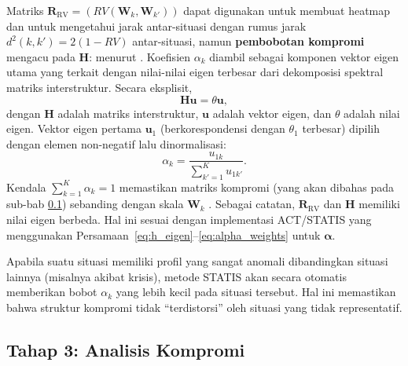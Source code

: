 Matriks $\mathbf{R}_{\mathrm{RV}}=(RV(\mathbf{W}_k,\mathbf{W}_{k'}))$ dapat digunakan untuk membuat heatmap dan untuk mengetahui jarak antar-situasi dengan rumus jarak $d^2(k,k')=2(1-RV)$ antar-situasi, namun \textbf{pembobotan kompromi} mengacu pada $\mathbf{H}$: menurut \citet{lavit94}. Koefisien $\alpha_k$ diambil sebagai komponen vektor eigen utama yang terkait dengan nilai-nilai eigen terbesar dari dekomposisi spektral matriks interstruktur. Secara eksplisit,
\begin{equation}\label{eq:h_eigen}
  \mathbf{H} \mathbf{u} = \theta \mathbf{u},
\end{equation}
dengan $\mathbf{H}$ adalah matriks interstruktur, $\mathbf{u}$ adalah vektor eigen, dan $\theta$ adalah nilai eigen. Vektor eigen pertama $\mathbf{u}_1$ (berkorespondensi dengan $\theta_1$ terbesar) dipilih dengan elemen non-negatif lalu dinormalisasi:
\begin{equation}\label{eq:alpha_weights}
  \alpha_k = \frac{u_{1k}}{\displaystyle\sum_{k'=1}^{K} u_{1k'}}.
\end{equation}
Kendala $\sum_{k=1}^{K} \alpha_k = 1$ memastikan matriks kompromi (yang akan dibahas pada sub-bab \ref{sec:compromise}) sebanding dengan skala $\mathbf{W}_k$ \citep{lavit94}. Sebagai catatan, $\mathbf{R}_{\mathrm{RV}}$ dan $\mathbf{H}$ memiliki nilai eigen berbeda. Hal ini sesuai dengan implementasi ACT/STATIS yang menggunakan Persamaan~\eqref{eq:h_eigen}--\eqref{eq:alpha_weights} untuk $\boldsymbol{\alpha}$.

\begin{example}
  Apabila suatu situasi memiliki profil yang sangat anomali dibandingkan situasi lainnya (misalnya akibat krisis), metode STATIS akan secara otomatis memberikan bobot $\alpha_k$ yang lebih kecil pada situasi tersebut. Hal ini memastikan bahwa struktur kompromi tidak ``terdistorsi'' oleh situasi yang tidak representatif.
\end{example}

\subsection{\normalsize Tahap 3: Analisis Kompromi} \label{sec:compromise}

